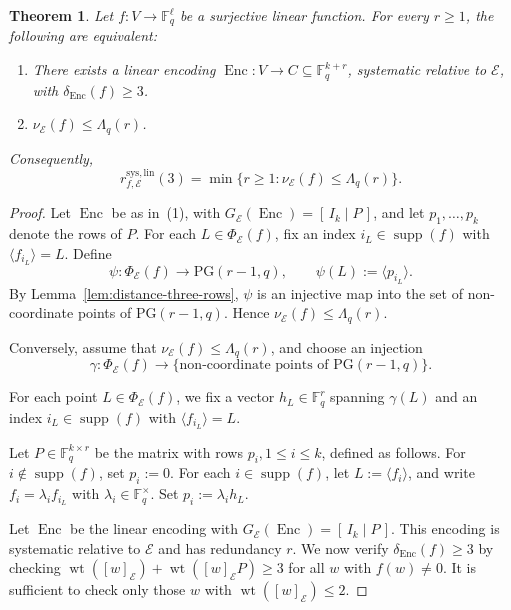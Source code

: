 \documentclass[a4paper,12pt]{article}
\theoremstyle{plain}
\newtheorem{theorem}[lemma]{Theorem}
\theoremstyle{definition}
\newcommand{\F}{\mathbb F}
\newcommand{\wt}{\operatorname{wt}}
\newcommand{\Enc}{\operatorname{Enc}}
\begin{document}
\begin{theorem}
\label{thm:systematic-distance-three}
Let $f\colon V\to\F_q^\ell$ be a surjective linear function. For
every $r\geq1$, the following are equivalent:
\begin{enumerate}
\item There exists a linear encoding
$\Enc\colon V\to C\subseteq\F_q^{k+r}$, systematic relative to
$\mathcal E$, with $\delta_{\Enc}(f)\geq3$.
\item $\nu_{\mathcal E}(f)\leq\Lambda_q(r)$.
\end{enumerate}
Consequently,
\[
r_{f,\mathcal E}^{\mathrm{sys,lin}}(3)
=
\min\{r\geq1:\nu_{\mathcal E}(f)\leq\Lambda_q(r)\}.
\]
\end{theorem}

\begin{proof}
Let $\Enc$ be as in~(1), with
$G_{\mathcal E}(\Enc)=[\,I_k\mid P\,]$, and let
$p_1,\dots,p_k$ denote the rows of $P$. For each
$L\in\Phi_{\mathcal E}(f)$, fix an index
$i_L\in\operatorname{supp}(f)$ with $\langle f_{i_L}\rangle=L$. 
Define
\[
\psi\colon\Phi_{\mathcal E}(f)\longrightarrow\mathrm{PG}(r-1,q),
\qquad
\psi(L):=\langle p_{i_L}\rangle.
\]
By Lemma~\ref{lem:distance-three-rows}, $\psi$ is an injective map into the set of non-coordinate points of $\mathrm{PG}(r-1,q)$. Hence
$\nu_{\mathcal E}(f)\leq\Lambda_q(r)$.

Conversely, assume that 
$\nu_{\mathcal E}(f)\leq\Lambda_q(r)$, and choose an injection
\[
\gamma\colon\Phi_{\mathcal E}(f)\longrightarrow
\{\text{non-coordinate points of }\mathrm{PG}(r-1,q)\}.
\]

For each point $L\in\Phi_{\mathcal E}(f)$, we fix a vector $h_L\in\F_q^r$
spanning $\gamma(L)$ and an index $i_L\in\operatorname{supp}(f)$
with $\langle f_{i_L}\rangle=L$.

Let $P\in\F_q^{k\times r}$ be the matrix with rows
$p_i, 1 \le i\le k$, defined as follows.
For $i\notin\operatorname{supp}(f)$, set
$p_i:=0$. 
For each $i\in\operatorname{supp}(f)$, let $L:=\langle f_i\rangle$,
and   write $f_i=\lambda_i f_{i_L}$ with $\lambda_i\in\F_q^\times$.
Set $p_i:=\lambda_ih_L$. 

Let $\Enc$ be the linear encoding with
$G_{\mathcal E}(\Enc)=[\,I_k\mid P\,]$.
This encoding is systematic relative to $\mathcal E$ and has redundancy $r$.
We now verify $\delta_{\Enc}(f)\geq3$ by checking
$\wt([w]_{\mathcal E})+\wt([w]_{\mathcal E}P)\geq3$ for all $w$
with $f(w)\neq0$. It is sufficient to check only those $w$ with $\wt([w]_{\mathcal E}) \le 2$. 


\end{proof}
\end{document}
